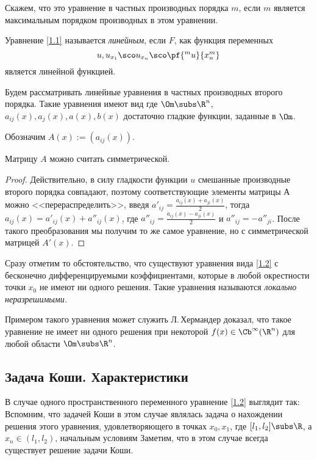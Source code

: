 \documentclass[a4paper,draft]{article}
\begin{document}
Скажем, что это уравнение в частных производных порядка $m$, если $m$ является максимальным порядком
производных в этом уравнении.

\begin{df}
Уравнение \eqref{1.1} называется \emph{линейным}, если $F$, как функция переменных
$$u, u_{x_1}\sco u_{x_n}\sco \pf{^m u}{x_{n}^m}$$
является линейной функцией.
\end{df}

Будем рассматривать линейные уравнения в частных производных второго порядка. Такие уравнения имеют вид
где $\Om \subs \R^n$, $a_{ij}(x), a_j(x), a(x), b(x)$
достаточно гладкие функции,
заданные в $\Om$.

Обозначим $A(x):=(a_{ij}(x))$.

\begin{stm}
Матрицу $A$ можно считать симметрической.
\end{stm}
\begin{proof}
Действительно, в силу гладкости функции $u$ смешанные производные второго порядка совпадают, поэтому
соответствующие элементы матрицы А можно <<перераспределить>>, введя
$a'_{ij}=\frac{a_{ij}(x)+a_{ji}(x)}{2}$, тогда $a_{ij}(x)=a'_{ij}(x)+a''_{ij}(x)$, где
$a''_{ij}=\frac{a_{ij}(x)-a_{ji}(x)}{2}$ и $a''_{ij}=-a''_{ji}$. После такого преобразования мы получим
то же самое уравнение, но с симметрической матрицей $A'(x)$.
\end{proof}

Сразу отметим то обстоятельство, что существуют уравнения вида \eqref{1.2} с бесконечно дифференцируемыми
коэффициентами, которые в любой окрестности точки $x_0$ не имеют  ни одного решения. Такие
уравнения называются \emph{локально неразрешимыми.}

Примером такого уравнения может служить
Л.\,Хермандер доказал, что такое уравнение не имеет ни одного решения при некоторой $f(x)\in \Cb^\infty(\R^n)$
для любой области $\Om\subs\R^n$.

\subsection{Задача Коши. Характеристики}

В случае одного пространственного переменного уравнение \eqref{1.2} выглядит так:
Вспомним, что задачей Коши в этом случае являлась задача о нахождении решения этого уравнения,
удовлетворяющего в точках $x_0, x_1$, где $[l_1,l_2]\subs\R$, а $x_n\in (l_1,l_2)$, начальным условиям
Заметим, что в этом случае всегда существует решение задачи Коши.
\end{document}
